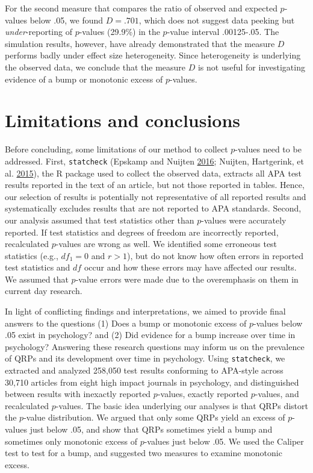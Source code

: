\documentclass[a5paper]{book}
\begin{document}
For the second measure that compares the ratio of observed and expected
\(p\)-values below .05, we found \(D=.701\), which does not suggest data
peeking but \emph{under}-reporting of \(p\)-values (29.9\%) in the
\(p\)-value interval .00125-.05. The simulation results, however, have
already demonstrated that the measure \(D\) performs badly under effect
size heterogeneity. Since heterogeneity is underlying the observed data,
we conclude that the measure \(D\) is not useful for investigating
evidence of a bump or monotonic excess of \(p\)-values.

\section{Limitations and conclusions}\label{limitations-and-conclusions}

Before concluding, some limitations of our method to collect
\(p\)-values need to be addressed. First, \texttt{statcheck} (Epskamp
and Nuijten \protect\hyperlink{ref-statcheck}{2016}; Nuijten,
Hartgerink, et al.
\protect\hyperlink{ref-doi:10.3758ux2fs13428-015-0664-2}{2015}), the R
package used to collect the observed data, extracts all APA test results
reported in the text of an article, but not those reported in tables.
Hence, our selection of results is potentially not representative of all
reported results and systematically excludes results that are not
reported to APA standards. Second, our analysis assumed that test
statistics other than \(p\)-values were accurately reported. If test
statistics and degrees of freedom are incorrectly reported, recalculated
\(p\)-values are wrong as well. We identified some erroneous test
statistics (e.g., \(df_1=0\) and \(r>1\)), but do not know how often
errors in reported test statistics and \(df\) occur and how these errors
may have affected our results. We assumed that \(p\)-value errors were
made due to the overemphasis on them in current day research.

In light of conflicting findings and interpretations, we aimed to
provide final answers to the questions (1) Does a bump or monotonic
excess of \(p\)-values below .05 exist in psychology? and (2) Did
evidence for a bump increase over time in psychology? Answering these
research questions may inform us on the prevalence of QRPs and its
development over time in psychology. Using \texttt{statcheck}, we
extracted and analyzed 258,050 test results conforming to APA-style
across 30,710 articles from eight high impact journals in psychology,
and distinguished between results with inexactly reported \(p\)-values,
exactly reported \(p\)-values, and recalculated \(p\)-values. The basic
idea underlying our analyses is that QRPs distort the \(p\)-value
distribution. We argued that only some QRPs yield an excess of
\(p\)-values just below .05, and show that QRPs sometimes yield a bump
and sometimes only monotonic excess of \(p\)-values just below .05. We
used the Caliper test to test for a bump, and suggested two measures to
examine monotonic excess.
\end{document}
